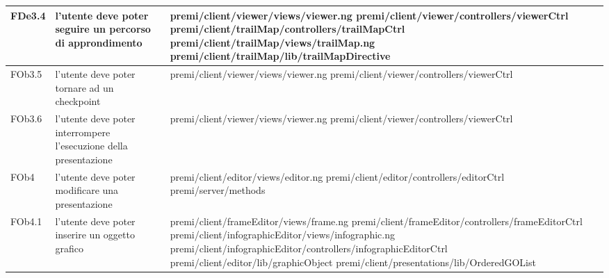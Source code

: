 \begin{longtable}{|l|p{5cm}|p{7cm}|}
\hline
FDe3.4 & l'utente deve poter seguire un percorso di approndimento & \hspace{0pt}premi/client/viewer/views/viewer.ng \linebreak \linebreak premi/client/viewer/controllers/viewerCtrl \linebreak \linebreak premi/client/trailMap/controllers/trailMapCtrl \linebreak \linebreak premi/client/trailMap/views/trailMap.ng \linebreak \linebreak premi/client/trailMap/lib/trailMapDirective \\
\hline
FOb3.5 & l'utente deve poter tornare ad un checkpoint & \hspace{0pt}premi/client/viewer/views/viewer.ng \linebreak \linebreak premi/client/viewer/controllers/viewerCtrl \\
\hline
FOb3.6 & l'utente deve poter interrompere l'esecuzione della presentazione & \hspace{0pt}premi/client/viewer/views/viewer.ng \linebreak \linebreak premi/client/viewer/controllers/viewerCtrl \\
\hline
FOb4 & l'utente deve poter modificare una presentazione & \hspace{0pt}premi/client/editor/views/editor.ng \linebreak \linebreak premi/client/editor/controllers/editorCtrl  \linebreak \linebreak premi/server/methods  \\
\hline
FOb4.1 & l'utente deve poter inserire un oggetto grafico & \hspace{0pt}premi/client/frameEditor/views/frame.ng \linebreak \linebreak premi/client/frameEditor/controllers/frameEditorCtrl \linebreak \linebreak premi/client/infographicEditor/views/infographic.ng \linebreak \linebreak premi/client/infographicEditor/controllers/infographicEditorCtrl \linebreak \linebreak premi/client/editor/lib/graphicObject \linebreak \linebreak premi/client/presentations/lib/OrderedGOList \\

\end{longtable}
